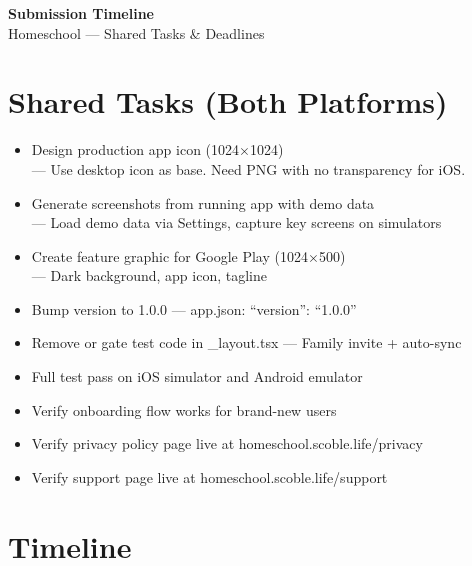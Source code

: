 \documentclass[9pt,letterpaper]{article}
\newcommand{\dt}[1]{{\footnotesize\color{lg}--- #1}}
\begin{document}
\newpage

\begin{center}
{\Large\bfseries Submission Timeline}\\[2pt]
{\small\color{mg}Homeschool --- Shared Tasks \& Deadlines}
\end{center}
\vspace{-0.5em}

\section*{Shared Tasks (Both Platforms)}
\begin{itemize}[leftmargin=1.5em, label=$\square$, itemsep=1pt, parsep=0pt, topsep=2pt]
  \item Design production app icon (1024$\times$1024)\\
    \dt{Use desktop icon as base. Need PNG with no transparency for iOS.}
  \item Generate screenshots from running app with demo data\\
    \dt{Load demo data via Settings, capture key screens on simulators}
  \item Create feature graphic for Google Play (1024$\times$500)\\
    \dt{Dark background, app icon, tagline}
  \item Bump version to 1.0.0 \dt{app.json: ``version'': ``1.0.0''}
  \item Remove or gate test code in \_layout.tsx \dt{Family invite + auto-sync}
  \item Full test pass on iOS simulator and Android emulator
  \item Verify onboarding flow works for brand-new users
  \item Verify privacy policy page live at homeschool.scoble.life/privacy
  \item Verify support page live at homeschool.scoble.life/support
\end{itemize}

\section*{Timeline}
\end{document}
